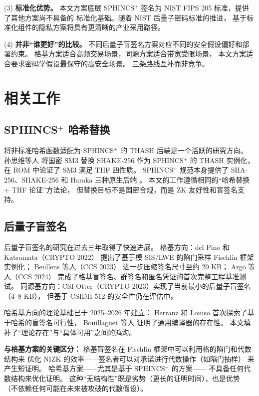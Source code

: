 \documentclass[11pt,a4paper]{ctexart}
\begin{document}
(3) \textbf{标准化优势。}
本文方案底层 SPHINCS$^+$ 签名为 NIST FIPS 205 标准，提供了其他方案尚不具备的
标准化基础。随着 NIST 后量子密码标准的推进，
基于标准化组件的隐私方案将具有更清晰的产业采用路径。

(4) \textbf{并非``谁更好''的比较。}
不同后量子盲签名方案对应不同的安全假设偏好和部署约束。
格基方案适合高频交易场景，同源方案适合带宽受限场景，
本文方案适合要求密码学假设最保守的高安全场景。
三条路线互补而非竞争。

\section{相关工作}

\subsection{SPHINCS$^+$ 哈希替换}

将非标准哈希函数适配为 SPHINCS$^+$ 的 THASH 后端是一个活跃的研究方向。
孙思维等人 \cite{Sun2023SPHINCSSM3} 将国密 SM3 替换 SHAKE-256
作为 SPHINCS$^+$ 的 THASH 实例化，在 ROM 中论证了 SM3 满足 THF 四性质。
SPHINCS$^+$ 规范本身提供了 SHA-256、SHAKE-256 和 Haraka 三种原生后端
\cite{Bernstein2019SPHINCS}。
本文的工作遵循相同的``哈希替换 + THF 论证''方法论，
但替换目标不是国密合规，而是 ZK 友好性和盲签名支持。

\subsection{后量子盲签名}

后量子盲签名的研究在过去三年取得了快速进展。
格基方向：del Pino 和 Katsumata（CRYPTO 2022）\cite{delPino2022Framework}
提出了基于模 SIS/LWE 的陷门采样 Fischlin 框架实例化；
Beullens 等人（CCS 2023）\cite{Beullens2023LatticeBlind}
进一步压缩签名尺寸至约 20 KB；
Argo 等人（CCS 2024）\cite{Argo2024PracticalPQ}
完成了格基盲签名、群签名和匿名凭证的首次完整工程基准测试。
同源基方向：CSI-Otter（CRYPTO 2023）实现了当前最小的后量子盲签名（4--8 KB），
但基于 CSIDH-512 的安全性仍在评估中。

哈希基方向的理论基础已于 2025--2026 年建立：
Herranz 和 Louiso \cite{Herranz2025HashBased}
首次探索了基于哈希的盲签名可行性，
Bouillaguet 等人 \cite{Bouillaguet2026BlindingPH}
证明了通用编译器的存在性。
本文填补了``理论存在''与``具体可用''之间的鸿沟。

\textbf{与格基方案的关键区分：}
格基盲签名在 Fischlin 框架中可以利用格的陷门和代数结构来
优化 NIZK 的效率——签名者可以对承诺进行代数操作（如陷门抽样）
来产生短证明。
哈希基方案——尤其是基于 SPHINCS$^+$ 的方案——
不具备任何代数结构来优化证明。
这种``无结构性''既是劣势（更长的证明时间），也是优势
（不依赖任何可能在未来被攻破的代数假设）。
\end{document}
